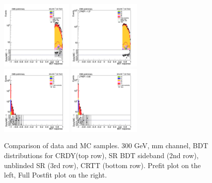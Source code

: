 \begin{figure}[tbp]
\begin{center}
    \includegraphics[width=0.31\textwidth]{figures/mm_300_SR_april21/bdt_response_afterCut_mm_SR_prefit_plot_apr21.png}                                                   
    \includegraphics[width=0.31\textwidth]{figures/mm_300_SR_april21/bdt_response_afterCut_mm_SR_FullPostfit_plot_apr21.png}\\                                            
    \includegraphics[width=0.31\textwidth]{figures/mm_300_april18/bdt_response_mm_CRTT_prefit_plot_apr18.png}                                                             
    \includegraphics[width=0.31\textwidth]{figures/mm_300_april18/bdt_response_mm_CRTT_FullPostfit_plot_apr18.png}\\                                                      
    \caption{Comparison of data and MC samples. 300 GeV, mm channel, BDT distributions for CRDY(top row), SR BDT sideband (2nd row), unblinded SR (3rd row), CRTT (bottom row). Prefit plot on the left,           Full Postfit plot on the right.}      
    \label{fig:bdt_mm}                                                                                                                                                    
  \end{center}                                                                                                                                                            
\end{figure}                                                                                                                                                              




